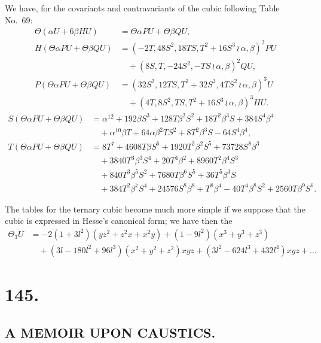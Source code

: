 \documentclass[11pt,a4paper]{book}
\begin{document}
\begin{center}
We have, for the covariants and contravariants of the cubic following Table No.~69:
\begin{align*}
\Theta(\alpha U + 6\beta HU) &= \Theta\alpha PU + \Theta\beta QU,\\
H(\Theta\alpha PU + \Theta\beta QU) &= (-2T, 48S^2, 18TS, T^2 + 16S^3 \, \wr\, \alpha, \beta)^2 PU\\
&\quad + (8S, T, -24S^2, -TS \, \wr\, \alpha, \beta)^2 QU,\\
P(\Theta\alpha PU + \Theta\beta QU) &= (32S^2, 12TS, T^2 + 32S^3, 4TS^2 \, \wr\, \alpha, \beta)^3 U\\
&\quad + (4T, 8S^2, TS, T^2 + 16S^3 \, \wr\, \alpha, \beta)^3 HU.
\end{align*}
\begin{align*}
S(\Theta\alpha PU + \Theta\beta QU) &= \alpha^{12} + 192\beta S^3 + 128T\beta^2S^2 + 18T^2\beta^3S + 384S^4\beta^4\\
&\quad + \alpha^{10}\beta T + 64\alpha\beta^2TS^2 + 8T^2\beta^3S - 64S^4\beta^4,\\
T(\Theta\alpha PU + \Theta\beta QU) &= 8T^7 + 4608T\beta S^6 + 1920T^2\beta^2S^5 + 73728S^8\beta^3\\
&\quad + 3840T^3\beta^3S^4 + 20T^4\beta^2 + 8960T^2\beta^4S^3\\
&\quad + 840T^3\beta^5S^2 + 7680T\beta^6S^5 + 36T^5\beta^3S\\
&\quad + 384T^2\beta^7S^4 + 24576S^8\beta^8 + T^8\beta^4 - 40T^4\beta^8S^2 + 2560T\beta^9S^6.
\end{align*}

The tables for the ternary cubic become much more simple if we suppose that
the cubic is expressed in Hesse's canonical form; we have then the
\begin{align*}
\Theta_3 U &= -2(1 + 3l^2)(yz^2 + z^2x + x^2y) + (1 - 9l^2)(x^3 + y^3 + z^3)\\
&\quad + (3l - 180l^2 + 96l^3)(x^2 + y^2 + z^2)xyz + (3l^2 - 624l^3 + 432l^4)xyz + \ldots
\end{align*}

\clearpage
\section*{145.}
\subsection*{A MEMOIR UPON CAUSTICS.}


\end{center}
\end{document}
